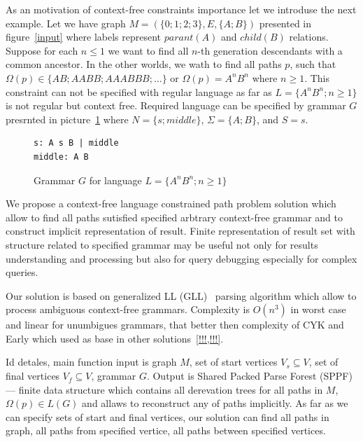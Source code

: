 \documentclass{sig-alternate} %
\begin{document}
As an motivation of context-free constraints importance let we introduse the next example.
Let we have graph $M=(\{0;1;2;3\},E,\{A;B\})$ presented in figure~\ref{input} where labels represent $parant (A)$ and $child (B)$ relations. 
Suppose for each $n \leq 1$ we want to find all $n$-th generation descendants with a common ancestor.
In the other worlds, we wath to find all paths $p$, such that $\Omega(p) \in \{AB; AABB; AAABBB; \dots\}$ or $\Omega(p) = A^n B^n$ where $n \geq 1$.
This constraint can not be specified with regular language as far as $L=\{A^n B^n; n \geq 1\}$ is not regular but context free.
Required language can be specified by grammar $G$ presrnted in picture~\ref{grammarG} where $N = \{s; middle\}$, $\Sigma = \{A; B\}$, and $S = s$.

\begin{figure}[h]
   \begin{center}
\begin{verbatim}
s: A s B | middle
middle: A B
\end{verbatim}
   \caption{Grammar $G$ for language $L=\{A^n B^n; n \geq 1\}$}
   \label{grammarG}        
   \end{center}
\end{figure}

We propose a context-free language constrained path problem solution which allow to find all paths sutisfied specified arbtrary context-free grammar and to construct implicit representation of result. 
Finite representation of result set with structure related to specified grammar may be useful not only for results understanding and processing but also for query debugging especially for complex queries. 

Our solution is based on generalized LL (GLL)~\cite{GLL} parsing algorithm which allow to process ambiguous context-free grammars.
Complexity is $O(n^3)$ in worst case and linear for unumbigues grammars, that better then complexity of CYK and Early which used as base in other solutions~\ref{!!!,!!!}.

Id detales, main function input is graph $M$, set of start vertices $V_s\subseteq V$, set of final vertices $V_f\subseteq V$, grammar $G$.
Output is Shared Packed Parse Forest (SPPF) --- finite data structure which contains all derevation trees for all paths in $M$, $\Omega(p) \in L(G)$ and allaws to reconstruct any of paths implicitly.
As far as we can specify sets of start and final vertices, our solution can find all paths in graph, all paths from specified vertice, all paths between specified vertices. 
\end{document}
